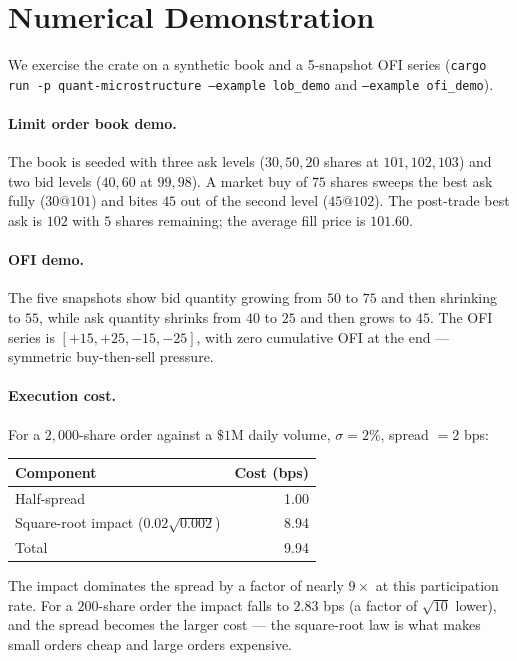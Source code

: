 \section{Numerical Demonstration}

We exercise the crate on a synthetic book and a 5-snapshot OFI series
(\texttt{cargo run -p quant-microstructure --example lob\_demo} and
\texttt{--example ofi\_demo}).

\paragraph{Limit order book demo.}
The book is seeded with three ask levels ($30, 50, 20$ shares at
$101, 102, 103$) and two bid levels ($40, 60$ at $99, 98$). A market
buy of $75$ shares sweeps the best ask fully ($30 @ 101$) and bites
$45$ out of the second level ($45 @ 102$). The post-trade best ask is
$102$ with $5$ shares remaining; the average fill price is
$101.60$.

\paragraph{OFI demo.}
The five snapshots show bid quantity growing from $50$ to $75$ and
then shrinking to $55$, while ask quantity shrinks from $40$ to $25$
and then grows to $45$. The OFI series is $[+15, +25, -15, -25]$, with
zero cumulative OFI at the end --- symmetric buy-then-sell pressure.

\paragraph{Execution cost.}
For a $2{,}000$-share order against a $\$1\text{M}$ daily volume,
$\sigma = 2\%$, spread $= 2$ bps:
\begin{center}
\begin{tabular}{lr}
\toprule
Component & Cost (bps) \\
\midrule
Half-spread & 1.00 \\
Square-root impact ($0.02\sqrt{0.002}$) & 8.94 \\
Total & 9.94 \\
\bottomrule
\end{tabular}
\end{center}

The impact dominates the spread by a factor of nearly $9\times$ at
this participation rate. For a $200$-share order the impact falls to
$2.83$ bps (a factor of $\sqrt{10}$ lower), and the spread becomes the
larger cost --- the square-root law is what makes small orders cheap
and large orders expensive.

